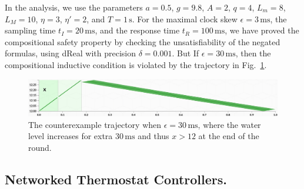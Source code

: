 In the analysis, we use the parameters 
$a = 0.5$, $g = 9.8$, $A = 2$, $q = 4$, $L_m = 8$, $L_M = 10$,
$\eta = 3$, $\eta' = 2$, and $T = 1\,\mathrm{s}$.
%
For the maximal clock skew $\epsilon = 3\,\mathrm{ms}$,
the sampling time $t_I = 20\,\mathrm{ms}$,
and the response time $t_R = 100\,\mathrm{ms}$,
we have proved the compositional safety property
 by checking the unsatisfiability of the negated formulas,
 using \textsf{dReal} with precision $\delta = 0.001$.
But If $\epsilon = 30\,\mathrm{ms}$,
then the compositional inductive condition is violated by the trajectory in Fig.~\ref{fig:water-error}.


\begin{figure}
\centering
\includegraphics[width=\columnwidth]{water-error.png}    
\caption{The counterexample trajectory when $\epsilon = 30\,\mathrm{ms}$,
where the water level increases for extra $30\,\mathrm{ms}$ and thus $x > 12$ at the end of the round.} \label{fig:water-error}
\end{figure}





\subsection{Networked Thermostat Controllers.}

